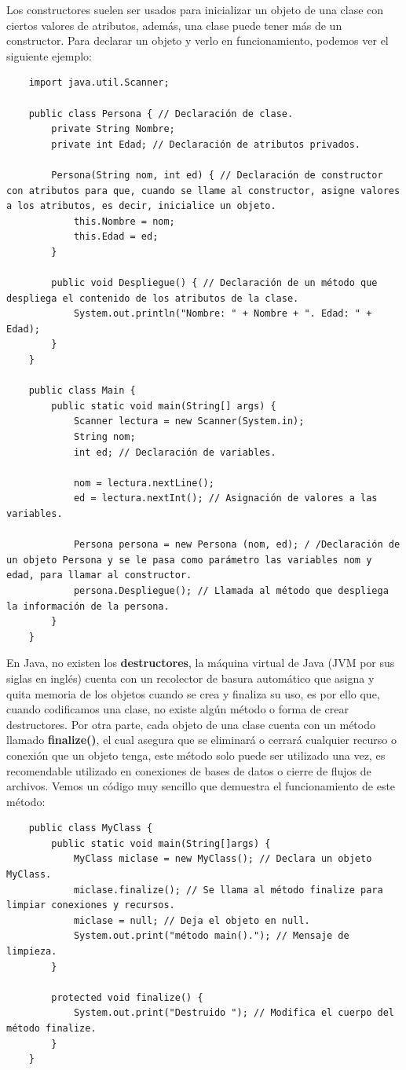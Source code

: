Los constructores suelen ser usados para inicializar un objeto de una clase con ciertos valores de atributos, además, una clase puede tener más de un constructor. Para declarar un objeto y verlo en funcionamiento, podemos ver el siguiente ejemplo:
\begin{lstlisting}
    import java.util.Scanner;
    
    public class Persona { // Declaración de clase.
        private String Nombre;
        private int Edad; // Declaración de atributos privados.
        
        Persona(String nom, int ed) { // Declaración de constructor con atributos para que, cuando se llame al constructor, asigne valores a los atributos, es decir, inicialice un objeto.
            this.Nombre = nom;
            this.Edad = ed;
        }
        
        public void Despliegue() { // Declaración de un método que despliega el contenido de los atributos de la clase.
            System.out.println("Nombre: " + Nombre + ". Edad: " + Edad);
        }
    }
    
    public class Main {
        public static void main(String[] args) {
            Scanner lectura = new Scanner(System.in);
            String nom;
            int ed; // Declaración de variables.
            
            nom = lectura.nextLine();
            ed = lectura.nextInt(); // Asignación de valores a las variables.
            
            Persona persona = new Persona (nom, ed); / /Declaración de un objeto Persona y se le pasa como parámetro las variables nom y edad, para llamar al constructor.
            persona.Despliegue(); // Llamada al método que despliega la información de la persona.
        }
    }
\end{lstlisting}

En Java, no existen los \textbf{destructores}, la máquina virtual de Java (JVM por sus siglas en inglés) cuenta con un recolector de basura automático que asigna y quita memoria de los objetos cuando se crea y finaliza su uso, es por ello que, cuando codificamos una clase, no existe algún método o forma de crear destructores. Por otra parte, cada objeto de una clase cuenta con un método llamado \textbf{finalize()}, el cual asegura que se eliminará o cerrará cualquier recurso o conexión que un objeto tenga, este método solo puede ser utilizado una vez, es recomendable utilizado en conexiones de bases de datos o cierre de flujos de archivos. Vemos un código muy sencillo que demuestra el funcionamiento de este método:
\begin{lstlisting}
    public class MyClass {
        public static void main(String[]args) {
            MyClass miclase = new MyClass(); // Declara un objeto MyClass.
            miclase.finalize(); // Se llama al método finalize para limpiar conexiones y recursos.
            miclase = null; // Deja el objeto en null.
            System.out.print("método main()."); // Mensaje de limpieza.
        }
        
       	protected void finalize() {
       		System.out.print("Destruido "); // Modifica el cuerpo del método finalize.
       	}
    }
\end{lstlisting}


